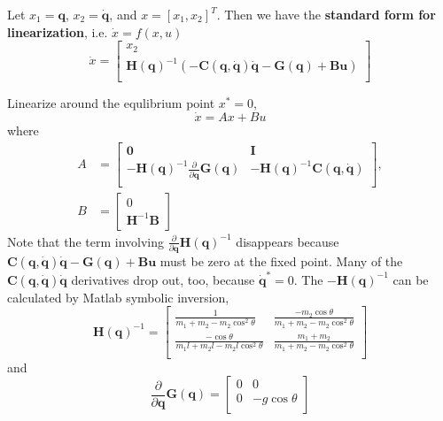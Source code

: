 Let $x_1=\mathbf{q}$, $x_2=\mathbf{\dot{q}}$, and $x=[x_1,x_2]^T$. Then we have the \textbf{standard form for linearization}, i.e. $\dot{x}=f(x,u)$
\begin{equation}
    \dot{x} = \left[ \begin{array}{c}
        x_2 \\ 
        \mathbf{H}(\mathbf{q})^{-1}(-\mathbf{C}(\mathbf{q},\mathbf{\dot{q}})\mathbf{\dot{q}} - \mathbf{G}(\mathbf{q}) + \mathbf{B}\mathbf{u}) \\ 
        \end{array} \right]
\end{equation}

Linearize around the equlibrium point $x^\ast=0$,
\begin{equation}
    \dot{x} = Ax + Bu
\end{equation}
where
\begin{align}
    A &= \left[ \begin{array}{cc}
        \mathbf{0} & \mathbf{I} \\ 
        -\mathbf{H}(\mathbf{q})^{-1}\frac{\partial}{\partial\mathbf{q}}\mathbf{G}(\mathbf{q}) & -\mathbf{H}(\mathbf{q})^{-1}\mathbf{C}(\mathbf{q},\mathbf{\dot{q}}) \\ 
        \end{array} \right], \\
        B &= \left[ \begin{array}{c}
            0 \\ 
            \mathbf{H}^{-1}\mathbf{B} 
            \end{array} \right]
\end{align}
Note that the term involving $\frac{\partial}{\partial\mathbf{q}}\mathbf{H}(\mathbf{q})^{-1}$ disappears because $\mathbf{C}(\mathbf{q},\mathbf{\dot{q}})\mathbf{\dot{q}} - \mathbf{G}(\mathbf{q}) + \mathbf{B}\mathbf{u}$ must be zero at the fixed point. Many of the $\mathbf{C}(\mathbf{q},\mathbf{\dot{q}})\mathbf{\dot{q}}$ derivatives drop out, too, because $\mathbf{\dot{q}}^\ast = 0$. The $-\mathbf{H}(\mathbf{q})^{-1}$ can be calculated by Matlab symbolic inversion,
\begin{equation}
    \mathbf{H}(\mathbf{q})^{-1} = \left[ \begin{array}{cc}
        \frac{1}{m_1+m_2-m_2\cos^2\theta} & \frac{-m_2\cos\theta}{m_1+m_2-m_2\cos^2\theta} \\ 
        \frac{-\cos\theta}{m_1l+m_2l-m_2l\cos^2\theta} & \frac{m_1+m_2}{m_1+m_2-m_2\cos^2\theta} \\ 
        \end{array} \right]
\end{equation}
and
\begin{equation}
    \frac{\partial}{\partial\mathbf{q}}\mathbf{G}(\mathbf{q}) = \left[ \begin{array}{cc}
        0 & 0 \\ 
        0 & -g\cos\theta \\ 
        \end{array} \right]
\end{equation}

